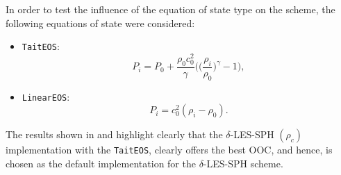 In order to test the influence of the equation of state type on the scheme, the following equations of state were considered:
\begin{itemize}
  \item \texttt{TaitEOS}:
  \begin{equation}
    P_i = P_0 + \frac{\rho_0 c_0^2}{\gamma} \bigg( \Big( \frac{\rho_i}{\rho_0} \Big)^{\gamma} - 1 \bigg),
  \end{equation}

  \item \texttt{LinearEOS}:
  \begin{equation}
    P_i = c_0^2 (\rho_i - \rho_0).
  \end{equation}
\end{itemize}
The results shown in  and  highlight clearly that the $\delta$-LES-SPH $(\rho_c)$ implementation with the \texttt{TaitEOS}, clearly offers the best OOC, and hence, is chosen as the default implementation for the $\delta$-LES-SPH scheme.

